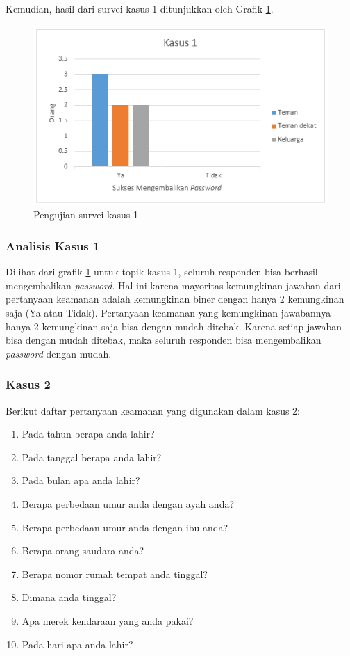 Kemudian, hasil dari survei kasus 1 ditunjukkan oleh Grafik \ref{fig:kasus1}.

\begin{figure}[H]
	\includegraphics[scale=0.8]{Gambar/kasus1}
	\centering
	\caption{Pengujian survei kasus 1}\label{fig:kasus1}
\end{figure}

\subsubsection{Analisis Kasus 1}

Dilihat dari grafik \ref{fig:kasus1} untuk topik kasus 1, seluruh responden bisa berhasil mengembalikan \textit{password}. Hal ini karena mayoritas kemungkinan jawaban dari pertanyaan keamanan adalah kemungkinan biner dengan hanya 2 kemungkinan saja (Ya atau Tidak). Pertanyaan keamanan yang kemungkinan jawabannya hanya 2 kemungkinan saja bisa dengan mudah ditebak. Karena setiap jawaban bisa dengan mudah ditebak, maka seluruh responden bisa mengembalikan \textit{password} dengan mudah.

\subsubsection{Kasus 2}

Berikut daftar pertanyaan keamanan yang digunakan dalam kasus 2:

\begin{enumerate}[itemsep=0mm]
	\item Pada tahun berapa anda lahir?
	\item Pada tanggal berapa anda lahir?
	\item Pada bulan apa anda lahir?
	\item Berapa perbedaan umur anda dengan ayah anda?
	\item Berapa perbedaan umur anda dengan ibu anda?
	\item Berapa orang saudara anda?
	\item Berapa nomor rumah tempat anda tinggal?
	\item Dimana anda tinggal?
	\item Apa merek kendaraan yang anda pakai?
	\item Pada hari apa anda lahir?
\end{enumerate}

